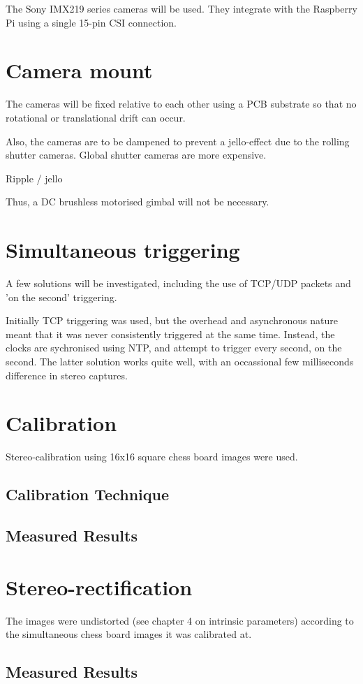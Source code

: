 The Sony IMX219 series cameras will be used. They integrate with the Raspberry Pi using a single 15-pin CSI connection.

\section{Camera mount}

The cameras will be fixed relative to each other using a PCB substrate so that no rotational or translational drift can occur.

Also, the cameras are to be dampened to prevent a jello-effect due to the rolling shutter cameras. Global shutter cameras are more expensive.

Ripple / jello

Thus, a DC brushless motorised gimbal will not be necessary.

\section{Simultaneous triggering}

A few solutions will be investigated, including the use of TCP/UDP packets and 'on the second' triggering.

Initially TCP triggering was used, but the overhead and asynchronous nature meant that it was never consistently triggered at the same time. Instead, the clocks are sychronised using NTP, and attempt to trigger every second, on the second. The latter solution works quite well, with an occassional few milliseconds difference in stereo captures.

\section{Calibration}

Stereo-calibration using 16x16 square chess board images were used.

\subsection{Calibration Technique}

\subsection{Measured Results}

\section{Stereo-rectification}

The images were undistorted (see chapter 4 on intrinsic parameters) according to the simultaneous chess board images it was calibrated at.

\subsection{Measured Results}